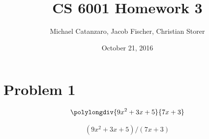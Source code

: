 \documentclass[letterpaper]{article}
\title{CS 6001 Homework 3}
\author{Michael Catanzaro, Jacob Fischer, Christian Storer}
\date{October 21, 2016}
\begin{document}
\maketitle

\section{Problem 1}

$$\polylongdiv{9x^2+3x+5}{7x+3}$$

\begin{equation*}
  \begin{split}
    (9x^2+3x+5) / (7x+3)
  \end{split}
\end{equation*}
\end{document}
